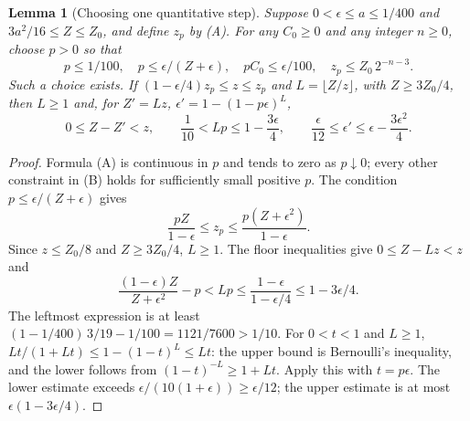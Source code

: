 \documentclass[reqno,a4paper,12pt]{amsart}
\newtheorem{lemma}[theorem]{Lemma}
\theoremstyle{definition}
\begin{document}
\begin{lemma}[Choosing one quantitative step]\label{lem:scalar-numerics}
Suppose $0<\epsilon\le a\le1/400$ and
$3a^2/16\le Z\le Z_0$, and define $z_p$ by (A).
For any $C_0\ge0$ and any integer $n\ge0$,
choose $p>0$ so that
\[
 p\le1/100,\quad p\le\epsilon/(Z+\epsilon),\quad
 pC_0\le\epsilon/100,\quad z_p\le Z_0\,2^{-n-3}.
 \tag{B}\label{eq:scalar-choice}
\]
Such a choice exists. If
$(1-\epsilon/4)z_p\le z\le z_p$ and $L=\lfloor Z/z\rfloor$, with
$Z\ge3Z_0/4$, then $L\ge1$ and, for
$Z'=Lz$, $\epsilon'=1-(1-p\epsilon)^L$,
\[
 0\le Z-Z'<z,\qquad
 \frac1{10}<Lp\le1-\frac{3\epsilon}{4},\qquad
 \frac{\epsilon}{12}\le\epsilon'\le\epsilon-\frac{3\epsilon^2}{4}.
 \tag{C}\label{eq:scalar-step-numbers}
\]
\end{lemma}
\begin{proof}
Formula (A) is continuous in $p$ and tends to zero as $p\downarrow0$;
every other constraint in (B) holds for sufficiently small positive $p$.
The condition $p\le\epsilon/(Z+\epsilon)$ gives
\[
 \frac{pZ}{1-\epsilon}\le z_p
 \le\frac{p(Z+\epsilon^2)}{1-\epsilon}.
\]
Since $z\le Z_0/8$ and $Z\ge3Z_0/4$, $L\ge1$.
The floor inequalities give $0\le Z-Lz<z$ and
\[
 \frac{(1-\epsilon)Z}{Z+\epsilon^2}-p<Lp
 \le\frac{1-\epsilon}{1-\epsilon/4}\le1-3\epsilon/4.
\]
The leftmost expression is at least
$(1-1/400)\,3/19-1/100=1121/7600>1/10$.
For $0<t<1$ and $L\ge1$,
$Lt/(1+Lt)\le1-(1-t)^L\le Lt$:
the upper bound is Bernoulli's inequality, and the lower follows
from $(1-t)^{-L}\ge1+Lt$. Apply this with $t=p\epsilon$.
The lower estimate exceeds $\epsilon/(10(1+\epsilon))\ge\epsilon/12$;
the upper estimate is at most $\epsilon(1-3\epsilon/4)$.
\end{proof}
\end{document}
